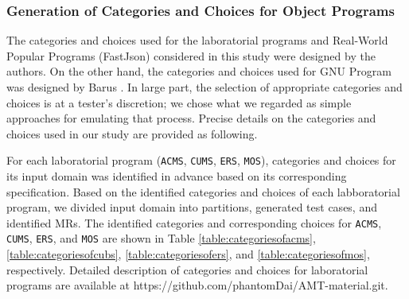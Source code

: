 \documentclass[10pt,journal,compsoc]{IEEEtran}
\begin{document}
\subsubsection{Generation of Categories and Choices for Object Programs}
\label{sec:generatecategories}

The categories and choices used for the laboratorial programs and Real-World Popular Programs (FastJson) considered in this study were designed by the authors. On the other hand, the categories and choices used for GNU Program was designed by Barus \cite{barus2016cost}. In large part, the selection of appropriate categories and choices is at a tester's discretion; we chose what we regarded as simple approaches for emulating that process. Precise details on the categories and choices used in our study are provided as following.

For each laboratorial program (\texttt{ACMS}, \texttt{CUMS}, \texttt{ERS}, \texttt{MOS}), categories and choices for its input domain was identified in advance based on its corresponding specification. Based on the identified categories and choices of each labboratorial program, we divided input domain into partitions, generated test cases, and identified MRs. The identified categories and corresponding choices for \texttt{ACMS}, \texttt{CUMS}, \texttt{ERS}, and \texttt{MOS} are shown in Table \ref{table:categoriesofacms}, \ref{table:categoriesofcubs}, \ref{table:categoriesofers}, and \ref{table:categoriesofmos}, respectively. Detailed description of categories and choices for laboratorial programs are available at https://github.com/phantomDai/AMT-material.git.
\end{document}
